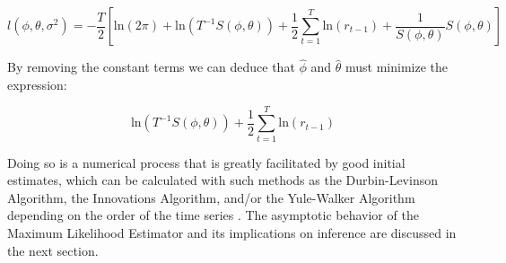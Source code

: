 $$ l(\phi,\theta, \sigma^2) = -\frac{T}{2}\left[\text{ln}(2\pi) +\text{ln}(T^{-1}S(\phi,\theta))+\frac{1}{2}\sum_{t=1}^T\text{ln}(r_{t-1}) + \frac{1}{S(\phi,\theta)}S(\phi,\theta)\right] $$

By removing the constant terms we can deduce that $\hat{\phi}$ and $\hat{\theta}$ must minimize the expression: 

$$ \text{ln}(T^{-1}S(\phi,\theta))+\frac{1}{2}\sum_{t=1}^T\text{ln}(r_{t-1})$$

Doing so is a numerical process that is greatly facilitated by good initial estimates, which can be calculated with such methods as the Durbin-Levinson Algorithm, the Innovations Algorithm, and/or the Yule-Walker Algorithm depending on the order of the time series \citep{BrockwellDavis1991}. The asymptotic behavior of the Maximum Likelihood Estimator and its implications on inference are discussed in the next section.





 


























